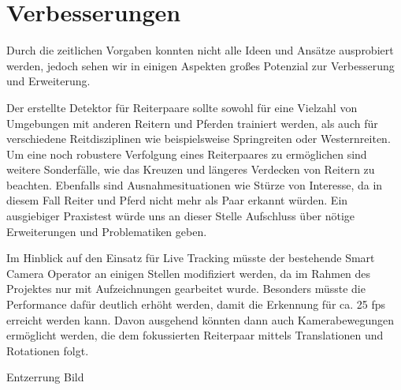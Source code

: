 \section{Verbesserungen}
Durch die zeitlichen Vorgaben konnten nicht alle Ideen und Ansätze ausprobiert werden, jedoch sehen wir in einigen Aspekten großes Potenzial zur Verbesserung und Erweiterung.

Der erstellte Detektor für Reiterpaare sollte sowohl für eine Vielzahl von Umgebungen mit anderen Reitern und Pferden trainiert werden, als auch für verschiedene Reitdisziplinen wie beispielsweise Springreiten oder Westernreiten. 
Um eine noch robustere Verfolgung eines Reiterpaares zu ermöglichen sind weitere Sonderfälle, wie das Kreuzen und längeres Verdecken von Reitern zu beachten. Ebenfalls sind Ausnahmesituationen wie Stürze von Interesse, da in diesem Fall Reiter und Pferd nicht mehr als Paar erkannt würden.
Ein ausgiebiger Praxistest würde uns an dieser Stelle Aufschluss über nötige Erweiterungen und Problematiken geben.

Im Hinblick auf den Einsatz für Live Tracking müsste der bestehende Smart Camera Operator an einigen Stellen modifiziert werden, da im Rahmen des Projektes nur mit Aufzeichnungen gearbeitet wurde. Besonders müsste die Performance dafür deutlich erhöht werden, damit die Erkennung für ca. 25 fps erreicht werden kann. Davon ausgehend könnten dann auch Kamerabewegungen ermöglicht werden, die dem fokussierten Reiterpaar mittels Translationen und Rotationen folgt.

Entzerrung Bild 